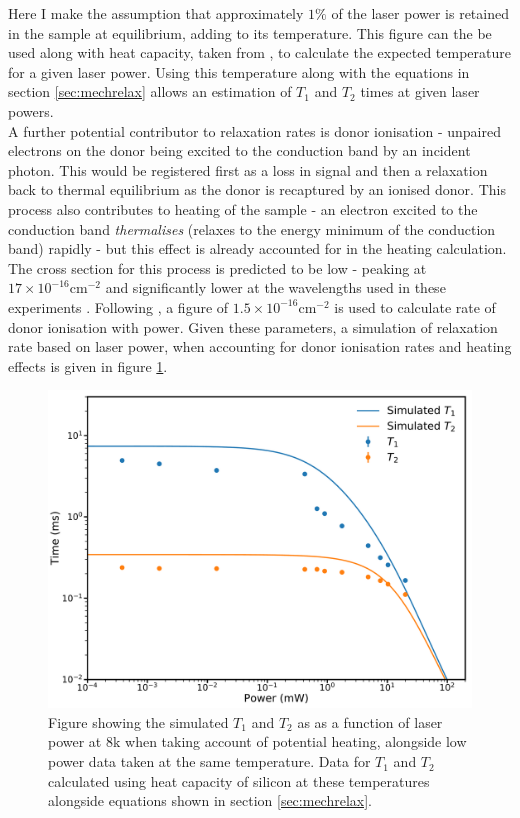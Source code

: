 Here I make the assumption that approximately $1\%$ of the laser power is retained in the sample at equilibrium, adding to its temperature.
This figure can the be used along with heat capacity, taken from \cite{Desai1986,Glazov2001}, to calculate the expected temperature for a given laser power.
Using this temperature along with the equations in section \ref{sec:mechrelax} allows an estimation of $T_1$ and $T_2$ times at given laser powers.
\\
A further potential contributor to relaxation rates is donor ionisation - unpaired electrons on the donor being excited to the conduction band by an incident photon.
This would be registered first as a loss in signal and then a relaxation back to thermal equilibrium as the donor is recaptured by an ionised donor.
This process also contributes to heating of the sample - an electron excited to the conduction band \emph{thermalises} (relaxes to the energy minimum of the conduction band) rapidly - but this effect is already accounted for in the heating calculation.
The cross section for this process is predicted to be low - peaking at $17\times10^{-16}\text{cm}^{-2}$ and significantly lower at the wavelengths used in these experiments \cite{Sclar1984,Ross2017a}. 
Following \cite{Ross2017a}, a figure of $1.5\times10^{-16}\text{cm}^{-2}$ is used to calculate rate of donor ionisation with power.
Given these parameters, a simulation of relaxation rate based on laser power, when accounting for donor ionisation rates and heating effects is given in figure \ref{fig:t1t2sim}.

\begin{figure}
\centering
\includegraphics[width = 0.8\columnwidth]{Figures/simt1t2.pdf} 
\caption[Simulated $T_1$ under heating]{Figure showing the simulated $T_1$ and $T_2$ as as a function of laser power at 8k when taking account of potential heating, alongside low power data taken at the same temperature. Data for $T_1$ and $T_2$ calculated using heat capacity of silicon at these temperatures alongside equations shown in section \ref{sec:mechrelax}.}
\label{fig:t1t2sim}
\end{figure}

